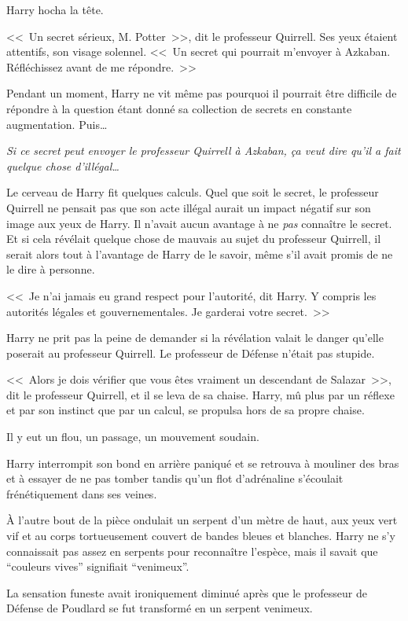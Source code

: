 Harry hocha la tête.

<<~Un secret sérieux, M. Potter~>>, dit le professeur Quirrell. Ses yeux étaient attentifs, son visage solennel. <<~Un secret qui pourrait m'envoyer à Azkaban. Réfléchissez avant de me répondre.~>>

Pendant un moment, Harry ne vit même pas pourquoi il pourrait être difficile de répondre à la question étant donné sa collection de secrets en constante augmentation. Puis…

\emph{Si ce secret peut envoyer le professeur Quirrell à Azkaban, ça veut dire qu'il a fait quelque chose d'illégal…}

Le cerveau de Harry fit quelques calculs. Quel que soit le secret, le professeur Quirrell ne pensait pas que son acte illégal aurait un impact négatif sur son image aux yeux de Harry. Il n'avait aucun avantage à ne \emph{pas} connaître le secret. Et si cela révélait quelque chose de mauvais au sujet du professeur Quirrell, il serait alors tout à l'avantage de Harry de le savoir, même s'il avait promis de ne le dire à personne.

<<~Je n'ai jamais eu grand respect pour l'autorité, dit Harry. Y compris les autorités légales et gouvernementales. Je garderai votre secret.~>>

Harry ne prit pas la peine de demander si la révélation valait le danger qu'elle poserait au professeur Quirrell. Le professeur de Défense n'était pas stupide.

<<~Alors je dois vérifier que vous êtes vraiment un descendant de Salazar~>>, dit le professeur Quirrell, et il se leva de sa chaise. Harry, mû plus par un réflexe et par son instinct que par un calcul, se propulsa hors de sa propre chaise.

Il y eut un flou, un passage, un mouvement soudain.

Harry interrompit son bond en arrière paniqué et se retrouva à mouliner des bras et à essayer de ne pas tomber tandis qu'un flot d'adrénaline s'écoulait frénétiquement dans ses veines.

À l'autre bout de la pièce ondulait un serpent d'un mètre de haut, aux yeux vert vif et au corps tortueusement couvert de bandes bleues et blanches. Harry ne s'y connaissait pas assez en serpents pour reconnaître l'espèce, mais il savait que “couleurs vives” signifiait “venimeux”.

La sensation funeste avait ironiquement diminué après que le professeur de Défense de Poudlard se fut transformé en un serpent venimeux.

